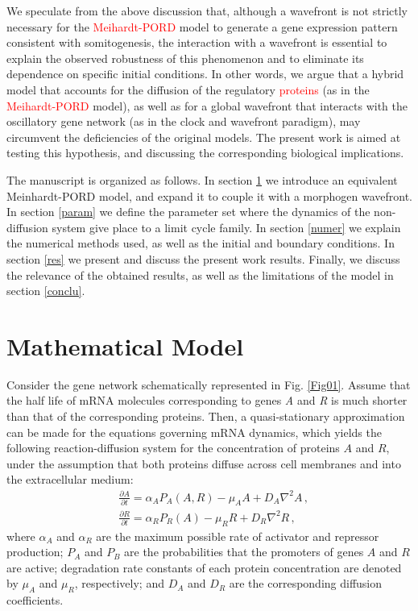 \documentclass[%
 preprint,
 aip, 
 amsmath,amssymb,
]{revtex4-2}
\begin{document}
We speculate from the above discussion that, although a wavefront is not strictly necessary for the \textcolor{red}{Meihardt-PORD} model to generate a gene expression pattern consistent with somitogenesis, the interaction with a wavefront is essential to explain the observed robustness of this phenomenon and to eliminate its dependence on specific initial conditions. In other words, we argue that a hybrid model that accounts for the diffusion of the regulatory \textcolor{red}{proteins} (as in the \textcolor{red}{Meihardt-PORD} model), as well as for a global wavefront that interacts with the oscillatory gene network (as in the clock and wavefront paradigm), may circumvent the deficiencies of the original models. The present work is aimed at testing this hypothesis, and discussing the corresponding biological implications.
	
The manuscript is organized as follows. In section \ref{model} we introduce an equivalent Meinhardt-PORD model, and expand it to couple it with a morphogen wavefront. In section \ref{param} we define the parameter set where the dynamics of the non-diffusion system give place to a limit cycle family. In section \ref{numer} we explain the numerical methods used, as well as the initial and boundary conditions. In section \ref{res} we present and discuss the present work results. Finally, we discuss the relevance of the obtained results, as well as the limitations of the model in section \ref{conclu}.
	
	\section{Mathematical Model}
	\label{model}
	
Consider the gene network schematically represented in Fig. \ref{Fig01}. Assume that the half life of mRNA molecules corresponding to genes \textit{A} and \textit{R} is much shorter than that of the corresponding proteins. Then, a quasi-stationary approximation can be made for the equations governing mRNA dynamics, which yields the following reaction-diffusion system for the concentration of proteins $A$ and $R$, under the assumption that both proteins diffuse across cell membranes and into the extracellular medium:
	\begin{subequations}\label{eq012}
		\begin{flalign}
		& \frac{\partial A}{\partial t} = \alpha_A P_A (A, R) - \mu_A A + D_A \nabla^2 A\,,
		\label{eq01} \\
		& \frac{\partial R}{\partial t} = \alpha_R P_R (A) - \mu_R R + D_R \nabla^2 R\,,
		\label{eq02}
		\end{flalign}
	\end{subequations}
where $\alpha_A$ and $\alpha_R$ are the maximum possible rate of activator and repressor production; $P_A$ and $P_B$ are the probabilities that the promoters of genes $A$ and $R$ are active; degradation rate constants of each protein concentration are denoted by $\mu_A$ and $\mu_R$, respectively; and $D_A$ and $D_R$ are the corresponding diffusion coefficients.
\end{document}
